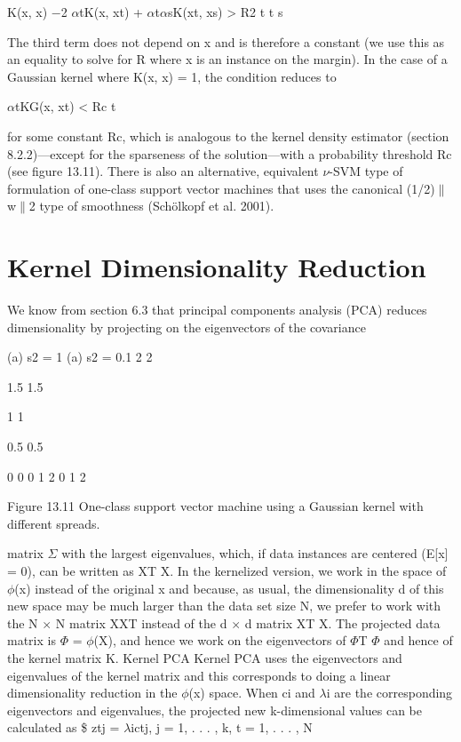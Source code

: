 K(x, x) $-$2 $\alpha$tK(x, xt) + $\alpha$t$\alpha$sK(xt, xs) > R2 t t s

The third term does not depend on x and is therefore a constant (we use this as an equality to solve for R where x is an instance on the margin). In the case of a Gaussian kernel where K(x, x) = 1, the condition reduces to

$\alpha$tKG(x, xt) < Rc t

for some constant Rc, which is analogous to the kernel density estimator (section 8.2.2)---except for the sparseness of the solution---with a probability threshold Rc (see figure 13.11). There is also an alternative, equivalent $\nu$-SVM type of formulation of one-class support vector machines that uses the canonical (1/2)$\parallel$w$\parallel$2 type of smoothness (Schölkopf et al. 2001).

\section{Kernel Dimensionality Reduction}

We know from section 6.3 that principal components analysis (PCA) reduces dimensionality by projecting on the eigenvectors of the covariance

(a) s2 = 1 (a) s2 = 0.1 2 2

1.5 1.5

1 1

0.5 0.5

0 0 0 1 2 0 1 2

Figure 13.11 One-class support vector machine using a Gaussian kernel with different spreads.

matrix $\Sigma$ with the largest eigenvalues, which, if data instances are centered (E[x] = 0), can be written as XT X. In the kernelized version, we work in the space of $\phi$(x) instead of the original x and because, as usual, the dimensionality d of this new space may be much larger than the data set size N, we prefer to work with the N $\times$ N matrix XXT instead of the d $\times$ d matrix XT X. The projected data matrix is $\Phi$ = $\phi$(X), and hence we work on the eigenvectors of $\Phi$T $\Phi$ and hence of the kernel matrix K. Kernel PCA Kernel PCA uses the eigenvectors and eigenvalues of the kernel matrix and this corresponds to doing a linear dimensionality reduction in the $\phi$(x) space. When ci and $\lambda$i are the corresponding eigenvectors and eigenvalues, the projected new k-dimensional values can be calculated as \$ ztj = $\lambda$ictj, j = 1, . . . , k, t = 1, . . . , N

